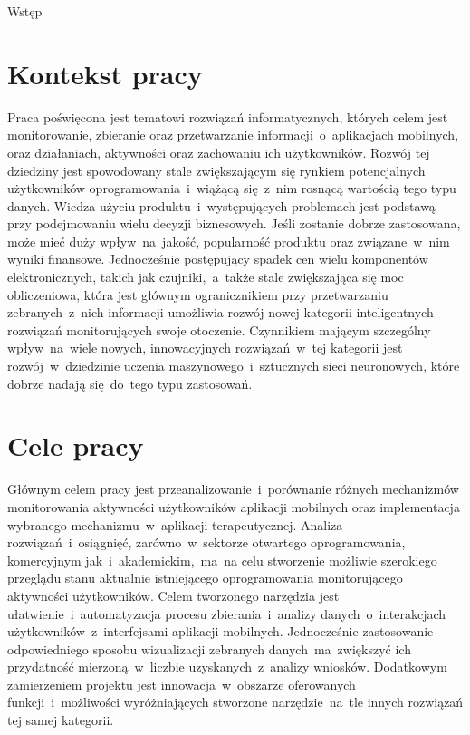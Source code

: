 \begin{chapter}{Wstęp}
	\newcommand{\chapterPath}{chapters/Introduction}

	\section{Kontekst pracy}
	Praca poświęcona jest tematowi rozwiązań informatycznych, których celem jest monitorowanie, zbieranie oraz przetwarzanie informacji~o~aplikacjach mobilnych, oraz działaniach, aktywności oraz zachowaniu ich użytkowników. Rozwój tej dziedziny jest spowodowany stale zwiększającym się rynkiem potencjalnych użytkowników oprogramowania~i~wiążącą się~z~nim rosnącą wartością tego typu danych. Wiedza użyciu produktu~i~występujących problemach jest podstawą przy podejmowaniu wielu decyzji biznesowych. Jeśli zostanie dobrze zastosowana, może mieć duży wpływ~na~jakość, popularność produktu oraz związane~w~nim wyniki finansowe. Jednocześnie postępujący spadek cen wielu komponentów elektronicznych, takich jak czujniki,~a~także stale zwiększająca się moc obliczeniowa, która jest głównym ogranicznikiem  przy przetwarzaniu zebranych~z~nich informacji umożliwia rozwój nowej kategorii inteligentnych rozwiązań monitorujących swoje otoczenie. Czynnikiem mającym szczególny wpływ~na~wiele nowych, innowacyjnych rozwiązań~w~tej kategorii jest rozwój~w~dziedzinie uczenia maszynowego~i~sztucznych sieci neuronowych, które dobrze nadają się~do~tego typu zastosowań.
	
	\section{Cele pracy}
	Głównym celem pracy jest przeanalizowanie~i~porównanie różnych mechanizmów monitorowania aktywności użytkowników aplikacji mobilnych oraz implementacja wybranego mechanizmu~w~aplikacji terapeutycznej. Analiza rozwiązań~i~osiągnięć, zarówno~w~sektorze otwartego oprogramowania, komercyjnym jak~i~akademickim,~ma~na celu stworzenie możliwie szerokiego przeglądu stanu aktualnie istniejącego oprogramowania monitorującego aktywności użytkowników. Celem tworzonego narzędzia jest ułatwienie~i~automatyzacja procesu zbierania~i~analizy danych~o~interakcjach użytkowników~z~interfejsami aplikacji mobilnych. Jednocześnie zastosowanie odpowiedniego sposobu wizualizacji zebranych danych~ma~zwiększyć ich przydatność mierzoną~w~liczbie uzyskanych~z~analizy wniosków. Dodatkowym zamierzeniem projektu jest innowacja~w~obszarze oferowanych funkcji~i~możliwości wyróżniających stworzone narzędzie~na~tle innych rozwiązań tej samej kategorii.
	

\end{chapter}
